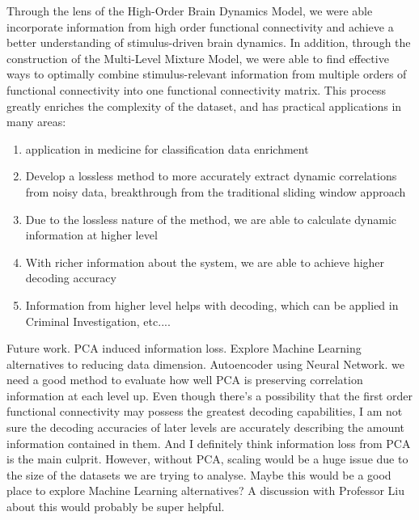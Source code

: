 \documentclass[11pt]{article}
\begin{document}
Through the lens of the High-Order Brain Dynamics Model, we were able incorporate information from high order functional connectivity and achieve a better understanding of stimulus-driven brain dynamics. In addition, through the construction of the Multi-Level Mixture Model, we were able to find effective ways to optimally combine stimulus-relevant information from multiple orders of functional connectivity into one functional connectivity matrix. This process greatly enriches the complexity of the dataset, and has practical applications in many areas:
\begin{enumerate}
\item application in medicine for classification data enrichment
\item Develop a lossless method to more accurately extract dynamic correlations from noisy data, breakthrough from the traditional sliding window approach
\item Due to the lossless nature of the method, we are able to calculate dynamic information at higher level
\item With richer information about the system, we are able to achieve higher decoding accuracy
\item Information from higher level helps with decoding, which can be applied in Criminal Investigation, etc....
\end{enumerate}

Future work. PCA induced information loss. Explore Machine Learning alternatives to reducing data dimension. Autoencoder using Neural Network. we need a good method to evaluate how well PCA is preserving correlation information at each level up. Even though there's a possibility that the first order functional connectivity may possess the greatest decoding capabilities, I am not sure the decoding accuracies of later levels are accurately describing the amount information contained in them. And I definitely think information loss from PCA is the main culprit. However, without PCA, scaling would be a huge issue due to the size of the datasets we are trying to analyse. Maybe this would be a good place to explore Machine Learning alternatives? A discussion with Professor Liu about this would probably be super helpful.
\end{document}
